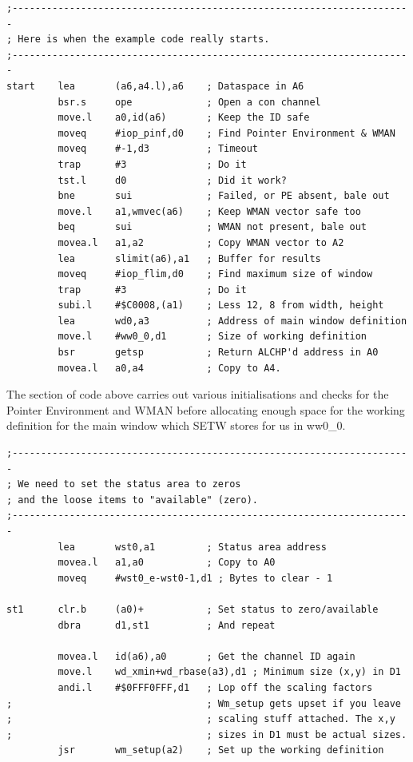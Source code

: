 \begin{lstlisting}[firstnumber=last,caption={Ex0 - Initialisation}]
;----------------------------------------------------------------------
; Here is when the example code really starts.
;----------------------------------------------------------------------
start    lea       (a6,a4.l),a6    ; Dataspace in A6
         bsr.s     ope             ; Open a con channel
         move.l    a0,id(a6)       ; Keep the ID safe
         moveq     #iop_pinf,d0    ; Find Pointer Environment & WMAN
         moveq     #-1,d3          ; Timeout
         trap      #3              ; Do it
         tst.l     d0              ; Did it work?
         bne       sui             ; Failed, or PE absent, bale out
         move.l    a1,wmvec(a6)    ; Keep WMAN vector safe too
         beq       sui             ; WMAN not present, bale out
         movea.l   a1,a2           ; Copy WMAN vector to A2
         lea       slimit(a6),a1   ; Buffer for results
         moveq     #iop_flim,d0    ; Find maximum size of window
         trap      #3              ; Do it
         subi.l    #$C0008,(a1)    ; Less 12, 8 from width, height
         lea       wd0,a3          ; Address of main window definition
         move.l    #ww0_0,d1       ; Size of working definition
         bsr       getsp           ; Return ALCHP'd address in A0
         movea.l   a0,a4           ; Copy to A4.
\end{lstlisting}

The section of code above carries out various initialisations and checks for
        the Pointer Environment and WMAN before allocating enough space for the working
        definition for the main window which SETW stores for us
        in ww0\_0.

\begin{lstlisting}[firstnumber=last,caption={Ex0 - Loose Item Initialisation}]
;----------------------------------------------------------------------
; We need to set the status area to zeros
; and the loose items to "available" (zero).
;----------------------------------------------------------------------
         lea       wst0,a1         ; Status area address
         movea.l   a1,a0           ; Copy to A0
         moveq     #wst0_e-wst0-1,d1 ; Bytes to clear - 1

st1      clr.b     (a0)+           ; Set status to zero/available
         dbra      d1,st1          ; And repeat

         movea.l   id(a6),a0       ; Get the channel ID again
         move.l    wd_xmin+wd_rbase(a3),d1 ; Minimum size (x,y) in D1
         andi.l    #$0FFF0FFF,d1   ; Lop off the scaling factors
;                                  ; Wm_setup gets upset if you leave
;                                  ; scaling stuff attached. The x,y 
;                                  ; sizes in D1 must be actual sizes.
         jsr       wm_setup(a2)    ; Set up the working definition
\end{lstlisting}

